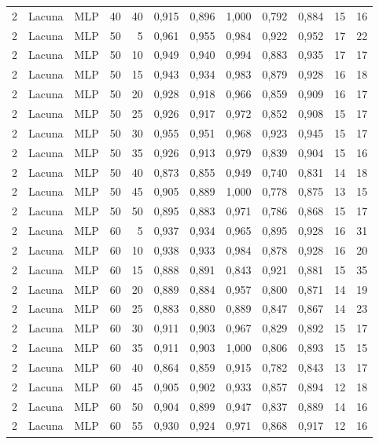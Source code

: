 \begin{longtable}{@{}rllrrrrrrrrr@{}}
2 & Lacuna & MLP & 40 & 40 & 0,915 & 0,896 & 1,000 & 0,792 & 0,884 & 15 & 16 \\
2 & Lacuna & MLP & 50 & 5 & 0,961 & 0,955 & 0,984 & 0,922 & 0,952 & 17 & 22 \\
2 & Lacuna & MLP & 50 & 10 & 0,949 & 0,940 & 0,994 & 0,883 & 0,935 & 17 & 17 \\
2 & Lacuna & MLP & 50 & 15 & 0,943 & 0,934 & 0,983 & 0,879 & 0,928 & 16 & 18 \\
2 & Lacuna & MLP & 50 & 20 & 0,928 & 0,918 & 0,966 & 0,859 & 0,909 & 16 & 17 \\
2 & Lacuna & MLP & 50 & 25 & 0,926 & 0,917 & 0,972 & 0,852 & 0,908 & 15 & 17 \\
2 & Lacuna & MLP & 50 & 30 & 0,955 & 0,951 & 0,968 & 0,923 & 0,945 & 15 & 17 \\
2 & Lacuna & MLP & 50 & 35 & 0,926 & 0,913 & 0,979 & 0,839 & 0,904 & 15 & 16 \\
2 & Lacuna & MLP & 50 & 40 & 0,873 & 0,855 & 0,949 & 0,740 & 0,831 & 14 & 18 \\
2 & Lacuna & MLP & 50 & 45 & 0,905 & 0,889 & 1,000 & 0,778 & 0,875 & 13 & 15 \\
2 & Lacuna & MLP & 50 & 50 & 0,895 & 0,883 & 0,971 & 0,786 & 0,868 & 15 & 17 \\
2 & Lacuna & MLP & 60 & 5 & 0,937 & 0,934 & 0,965 & 0,895 & 0,928 & 16 & 31 \\
2 & Lacuna & MLP & 60 & 10 & 0,938 & 0,933 & 0,984 & 0,878 & 0,928 & 16 & 20 \\
2 & Lacuna & MLP & 60 & 15 & 0,888 & 0,891 & 0,843 & 0,921 & 0,881 & 15 & 35 \\
2 & Lacuna & MLP & 60 & 20 & 0,889 & 0,884 & 0,957 & 0,800 & 0,871 & 14 & 19 \\
2 & Lacuna & MLP & 60 & 25 & 0,883 & 0,880 & 0,889 & 0,847 & 0,867 & 14 & 23 \\
2 & Lacuna & MLP & 60 & 30 & 0,911 & 0,903 & 0,967 & 0,829 & 0,892 & 15 & 17 \\
2 & Lacuna & MLP & 60 & 35 & 0,911 & 0,903 & 1,000 & 0,806 & 0,893 & 15 & 15 \\
2 & Lacuna & MLP & 60 & 40 & 0,864 & 0,859 & 0,915 & 0,782 & 0,843 & 13 & 17 \\
2 & Lacuna & MLP & 60 & 45 & 0,905 & 0,902 & 0,933 & 0,857 & 0,894 & 12 & 18 \\
2 & Lacuna & MLP & 60 & 50 & 0,904 & 0,899 & 0,947 & 0,837 & 0,889 & 14 & 16 \\
2 & Lacuna & MLP & 60 & 55 & 0,930 & 0,924 & 0,971 & 0,868 & 0,917 & 12 & 16 \\

\end{longtable}
